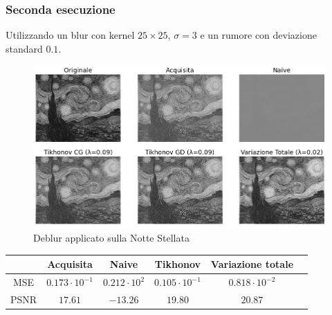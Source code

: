 \documentclass[11pt]{article}
\begin{document}
\subsubsection{Seconda esecuzione}
Utilizzando un blur con kernel $25 \times 25$, $\sigma=3$ e un rumore con deviazione standard $0.1$.
\begin{figure}[H]
    \centering
    \includegraphics[width=15cm]{reale/1/2/deblur.png}
    \caption{Deblur applicato sulla Notte Stellata}
    \label{fig:deblur_reale1_2}
\end{figure}
\begin{center}
    \begin{tabular}{ |c|c|c|c|c|c| }
    \hline
    & Acquisita & Naive & Tikhonov & Variazione totale \\ 
    \hline
    MSE & $0.173 \cdot 10^{-1}$ & $0.212 \cdot 10^{2}$ & $0.105 \cdot 10^{-1}$ & $0.818 \cdot 10^{-2}$ \\ 
    PSNR & $17.61$ & $-13.26$ & $19.80$ & $20.87$ \\ 
    \hline
    \end{tabular}
\end{center}
\end{document}
